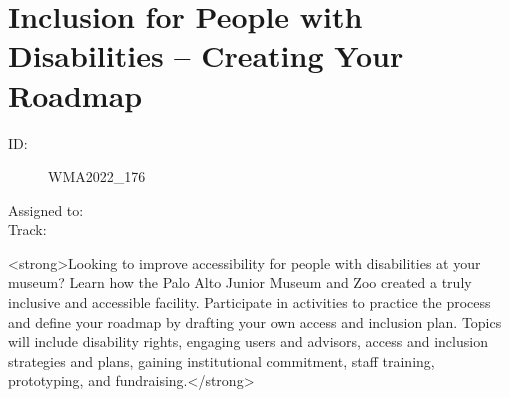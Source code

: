 \documentclass{report}
\begin{document}
              
        
          \newpage
          \section{ Inclusion for People with Disabilities – Creating Your Roadmap }
            \begin{description}
              \item [ID:]
              WMA2022\_176

              \item [Assigned to:]
                \item [Track:]
              \end{description}

              <strong>Looking to improve accessibility for people with disabilities at your museum? Learn how the Palo Alto Junior Museum and Zoo created a truly inclusive and accessible facility. Participate in activities to practice the process and define your roadmap by drafting your own access and inclusion plan. Topics will include disability rights, engaging users and advisors, access and inclusion strategies and plans, gaining institutional commitment, staff training, prototyping, and fundraising.</strong>
\end{document}
